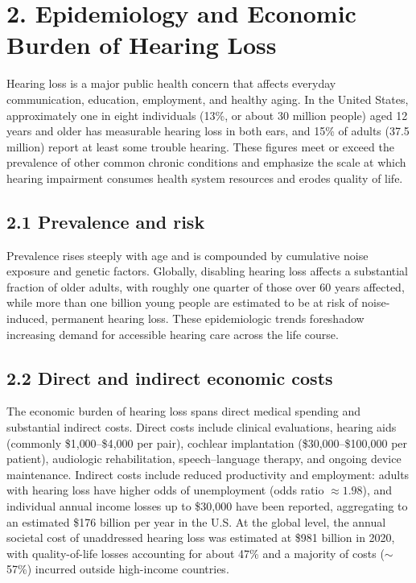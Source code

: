 \section*{2. Epidemiology and Economic Burden of Hearing Loss}
Hearing loss is a major public health concern that affects everyday communication, education, employment, and healthy aging. In the United States, approximately one in eight individuals (13\%, or about 30 million people) aged 12 years and older has measurable hearing loss in both ears, and 15\% of adults (37.5 million) report at least some trouble hearing.\cite{nidcd2021, cdc2010, cdc2021, wilson2014} These figures meet or exceed the prevalence of other common chronic conditions and emphasize the scale at which hearing impairment consumes health system resources and erodes quality of life.

\subsection*{2.1 Prevalence and risk}
Prevalence rises steeply with age and is compounded by cumulative noise exposure and genetic factors. Globally, disabling hearing loss affects a substantial fraction of older adults, with roughly one quarter of those over 60 years affected, while more than one billion young people are estimated to be at risk of noise-induced, permanent hearing loss.\cite{WHO2025} These epidemiologic trends foreshadow increasing demand for accessible hearing care across the life course.

\subsection*{2.2 Direct and indirect economic costs}
The economic burden of hearing loss spans direct medical spending and substantial indirect costs. Direct costs include clinical evaluations, hearing aids (commonly \$1{,}000--\$4{,}000 per pair), cochlear implantation (\$30{,}000--\$100{,}000 per patient), audiologic rehabilitation, speech--language therapy, and ongoing device maintenance. Indirect costs include reduced productivity and employment: adults with hearing loss have higher odds of unemployment (odds ratio \(\approx 1.98\)), and individual annual income losses up to \$30{,}000 have been reported, aggregating to an estimated \$176 billion per year in the U.S.\cite{SocietyCosts2000, Kim2020, Colburn2019, WHO2025} At the global level, the annual societal cost of unaddressed hearing loss was estimated at \$981 billion in 2020, with quality-of-life losses accounting for about 47\% and a majority of costs (\(\sim\)57\%) incurred outside high-income countries.\cite{McDaid2021}

